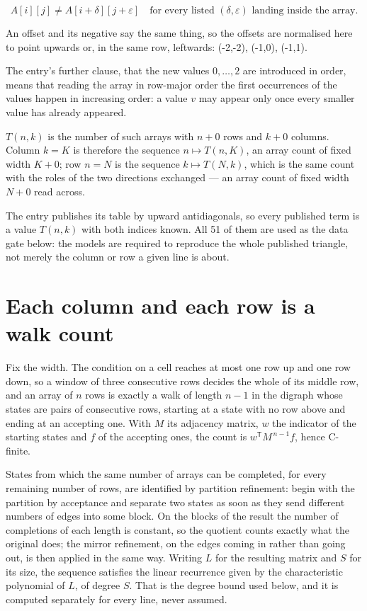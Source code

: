 \documentclass[11pt]{article}
\theoremstyle{definition}
\begin{document}
\[A[i][j] \ne A[i{+}\delta][j{+}\varepsilon]\quad\text{for every listed }(\delta,\varepsilon)\text{ landing inside the array.}\]

An offset and its negative say the same thing, so the offsets are normalised here to point upwards or, in the same row, leftwards: (-2,-2), (-1,0), (-1,1).

The entry's further clause, that the new values $0,\dots,2$ are introduced in order, means that reading the array in row-major order the first occurrences of the values happen in increasing order: a value $v$ may appear only once every smaller value has already appeared.

$T(n,k)$ is the number of such arrays with $n + 0$ rows and $k + 0$ columns. Column $k = K$ is therefore the sequence $n \mapsto T(n,K)$, an array count of fixed width $K + 0$; row $n = N$ is the sequence $k \mapsto T(N,k)$, which is the same count with the roles of the two directions exchanged --- an array count of fixed width $N + 0$ read across.

The entry publishes its table by upward antidiagonals, so every published term is a value $T(n,k)$ with both indices known. All 51 of them are used as the data gate below: the models are required to reproduce the whole published triangle, not merely the column or row a given line is about.

\section{Each column and each row is a walk count}

Fix the width. The condition on a cell reaches at most one row up and one row down, so a window of three consecutive rows decides the whole of its middle row, and an array of $n$ rows is exactly a walk of length $n-1$ in the digraph whose states are pairs of consecutive rows, starting at a state with no row above and ending at an accepting one. With $M$ its adjacency matrix, $w$ the indicator of the starting states and $f$ of the accepting ones, the count is $w^{\mathsf T}M^{\,n-1}f$, hence C-finite.

States from which the same number of arrays can be completed, for every remaining number of rows, are identified by partition refinement: begin with the partition by acceptance and separate two states as soon as they send different numbers of edges into some block. On the blocks of the result the number of completions of each length is constant, so the quotient counts exactly what the original does; the mirror refinement, on the edges coming in rather than going out, is then applied in the same way. Writing $L$ for the resulting matrix and $S$ for its size, the sequence satisfies the linear recurrence given by the characteristic polynomial of $L$, of degree $S$. That is the degree bound used below, and it is computed separately for every line, never assumed.
\end{document}
